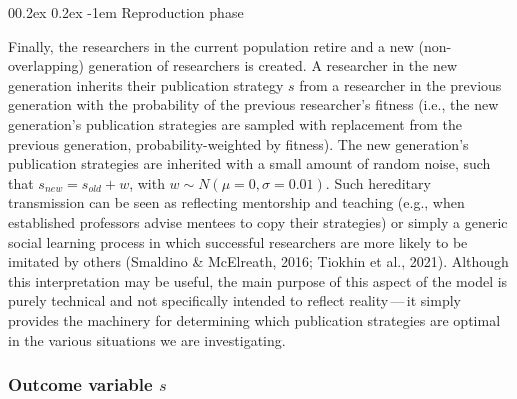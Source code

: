 \documentclass[
  ,man,mask,floatsintext]{apa6}
\makeatletter
\let\oldparagraph\paragraph
\renewcommand{\paragraph}[1]{\oldparagraph{#1}\mbox{}}
\renewcommand{\paragraph}{\@startsection{paragraph}{4}{\parindent}%
  {0\baselineskip \@plus 0.2ex \@minus 0.2ex}%
  {-1em}%
  {\normalfont\normalsize\bfseries\itshape\typesectitle}}
\makeatother
\begin{document}
\hypertarget{reproduction-phase}{%
\paragraph{Reproduction phase}\label{reproduction-phase}}

Finally, the researchers in the current population retire and a new (non-overlapping) generation of researchers is created.
A researcher in the new generation inherits their publication strategy \(s\) from a researcher in the previous generation with the probability of the previous researcher's fitness (i.e., the new generation's publication strategies are sampled with replacement from the previous generation, probability-weighted by fitness).
The new generation's publication strategies are inherited with a small amount of random noise, such that \(s_{new} = s_{old} + w\), with \(w \sim N(\mu = 0, \sigma = 0.01)\).
Such hereditary transmission can be seen as reflecting mentorship and teaching (e.g., when established professors advise mentees to copy their strategies) or simply a generic social learning process in which successful researchers are more likely to be imitated by others (Smaldino \& McElreath, 2016; Tiokhin et al., 2021).
Although this interpretation may be useful, the main purpose of this aspect of the model is purely technical and not specifically intended to reflect reality\(\,\)---\(\,\)it simply provides the machinery for determining which publication strategies are optimal in the various situations we are investigating.

\hypertarget{outcome-variable-s}{%
\subsubsection{\texorpdfstring{Outcome variable \(s\)}{Outcome variable s}}\label{outcome-variable-s}}
\end{document}
